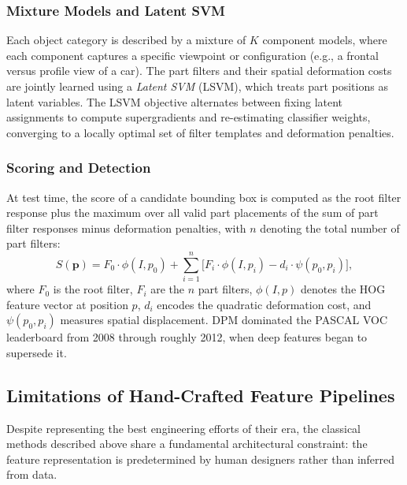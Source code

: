 \documentclass[conference]{IEEEtran}
\begin{document}
\subsubsection*{Mixture Models and Latent SVM}

Each object category is described by a mixture of $K$ component
models, where each component captures a specific viewpoint or
configuration (e.g., a frontal versus profile view of a car).
The part filters and their spatial deformation costs are jointly
learned using a \emph{Latent SVM} (LSVM), which treats part
positions as latent variables.
The LSVM objective alternates between fixing latent assignments
to compute supergradients and re-estimating classifier weights,
converging to a locally optimal set of filter templates and
deformation penalties.

\subsubsection*{Scoring and Detection}

At test time, the score of a candidate bounding box is computed
as the root filter response plus the maximum over all valid
part placements of the sum of part filter responses minus
deformation penalties, with $n$ denoting the total number of
part filters:
\begin{equation}
  S(\mathbf{p}) = F_0 \cdot \phi(I, p_0)
    + \sum_{i=1}^{n}\bigl[F_i \cdot \phi(I,p_i)
    - d_i \cdot \psi(p_0,p_i)\bigr],
  \label{eq:dpm}
\end{equation}
where $F_0$ is the root filter, $F_i$ are the $n$ part filters,
$\phi(I, p)$ denotes the HOG feature vector at position $p$,
$d_i$ encodes the quadratic deformation cost, and
$\psi(p_0, p_i)$ measures spatial displacement.
DPM dominated the PASCAL VOC leaderboard from 2008 through
roughly 2012, when deep features began to supersede it.

\subsection{Limitations of Hand-Crafted Feature Pipelines}
\label{subsec:limits}

Despite representing the best engineering efforts of their era,
the classical methods described above share a fundamental
architectural constraint: the feature representation is
predetermined by human designers rather than inferred from
data.
\end{document}
